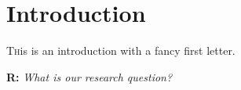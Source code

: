 \section{Introduction}
\label{sec:intro}

\lettrine[nindent=0em,lines=3]{T}his is an introduction with a fancy first letter. \blindtext

\begin{displayquote}
    \textbf{R:} \emph{What is our research question?}
\end{displayquote}

\blindtext